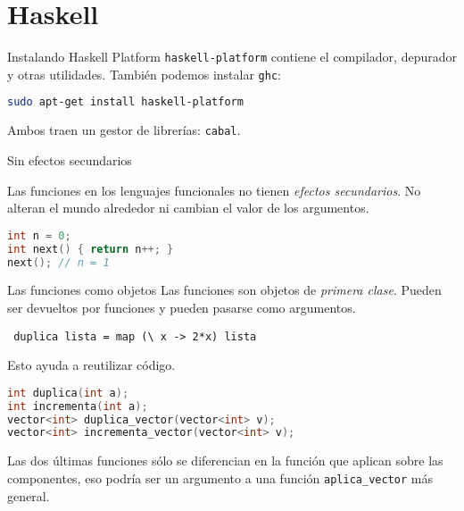 \section{Haskell}

\begin{frame}[fragile]{Instalando Haskell Platform}
  \texttt{haskell-platform} contiene el compilador, depurador y otras utilidades.
  También podemos instalar \texttt{ghc}:
  \espacio
  \begin{lstlisting}[language=bash]
sudo apt-get install haskell-platform
  \end{lstlisting}
  \espacio
  Ambos traen un gestor de librerías: \texttt{cabal}.
\end{frame}

\begin{frame}[fragile]{Sin efectos secundarios}

    Las funciones en los lenguajes funcionales no tienen \textit{efectos secundarios}.
    No alteran el mundo alrededor ni cambian el valor de los argumentos.
    \espacio
  \begin{lstlisting}[language=C++]
int n = 0;
int next() { return n++; }
next(); // n = 1
  \end{lstlisting}

\end{frame}

\begin{frame}[fragile]{Las funciones como objetos}
 Las funciones son objetos de \textit{primera clase}. Pueden ser devueltos
 por funciones y pueden pasarse como argumentos.

 \begin{lstlisting}
 duplica lista = map (\ x -> 2*x) lista
 \end{lstlisting}

 Esto ayuda a reutilizar código.
 \begin{lstlisting}[language=C++]
int duplica(int a);
int incrementa(int a);
vector<int> duplica_vector(vector<int> v);
vector<int> incrementa_vector(vector<int> v);
 \end{lstlisting}
 Las dos últimas funciones sólo se diferencian en la función
 que aplican sobre las componentes, eso podría ser un argumento
 a una función \texttt{aplica\_vector} más general.

\end{frame}


